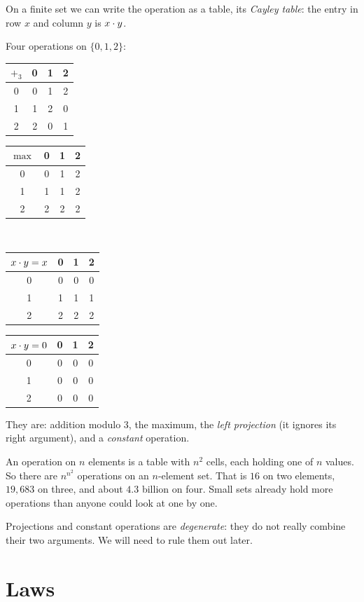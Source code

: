 \documentclass[11pt,a4paper]{article}
\begin{document}
On a finite set we can write the operation as a table, its \emph{Cayley table}: the entry in row $x$ and column $y$
is $x\cdot y$.

\begin{example}\label{ex:tables}
Four operations on $\{0,1,2\}$:
\begin{center}
\begin{tabular}{c|ccc}
$+_3$ & 0 & 1 & 2\\ \hline
0 & 0 & 1 & 2\\ 1 & 1 & 2 & 0\\ 2 & 2 & 0 & 1
\end{tabular}\qquad
\begin{tabular}{c|ccc}
$\max$ & 0 & 1 & 2\\ \hline
0 & 0 & 1 & 2\\ 1 & 1 & 1 & 2\\ 2 & 2 & 2 & 2
\end{tabular}\\[10pt]
\begin{tabular}{c|ccc}
$x\cdot y=x$ & 0 & 1 & 2\\ \hline
0 & 0 & 0 & 0\\ 1 & 1 & 1 & 1\\ 2 & 2 & 2 & 2
\end{tabular}\qquad
\begin{tabular}{c|ccc}
$x\cdot y=0$ & 0 & 1 & 2\\ \hline
0 & 0 & 0 & 0\\ 1 & 0 & 0 & 0\\ 2 & 0 & 0 & 0
\end{tabular}
\end{center}
They are: addition modulo 3, the maximum, the \emph{left projection} (it ignores its right argument), and a
\emph{constant} operation.
\end{example}

An operation on $n$ elements is a table with $n^2$ cells, each holding one of $n$ values. So there are
$n^{n^2}$ operations on an $n$-element set. That is $16$ on two elements, $19{,}683$ on three, and about $4.3$ billion on
four. Small sets already hold more operations than anyone could look at one by one.

Projections and constant operations are \emph{degenerate}: they do not really combine their two arguments. We will
need to rule them out later.


\section{Laws}
\end{document}
